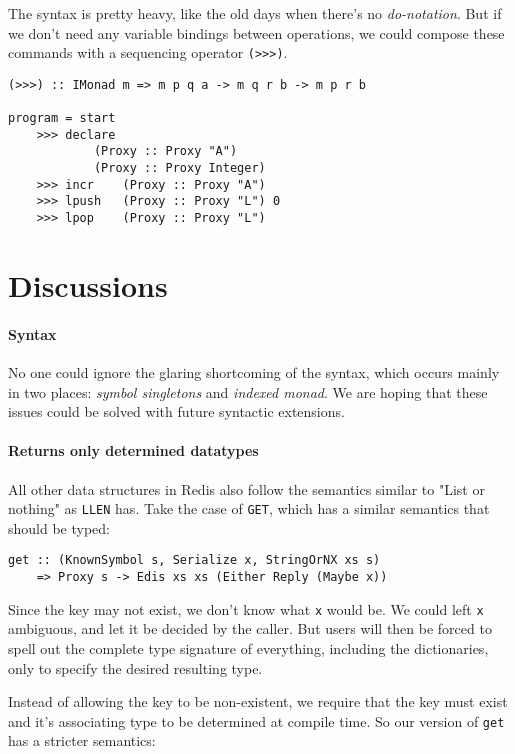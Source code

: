 \documentclass[pldi]{sigplanconf-pldi16}
\begin{document}
The syntax is pretty heavy, like the old days when there's no
 \emph{do-notation}\cite{history}. But if we don't need any variable bindings
 between operations, we could compose these commands with a sequencing operator
 \texttt{(>>>)}.

\begin{verbatim}
(>>>) :: IMonad m => m p q a -> m q r b -> m p r b

program = start
    >>> declare
            (Proxy :: Proxy "A")
            (Proxy :: Proxy Integer)
    >>> incr    (Proxy :: Proxy "A")
    >>> lpush   (Proxy :: Proxy "L") 0
    >>> lpop    (Proxy :: Proxy "L")
\end{verbatim}

\section{Discussions}
\paragraph{Syntax}
No one could ignore the glaring shortcoming of the syntax, which occurs mainly
 in two places: \emph{symbol singletons} and \emph{indexed monad}. We are hoping
 that these issues could be solved with future syntactic extensions.

\paragraph{Returns only determined datatypes}

All other data structures in Redis also follow the semantics similar to
 "List or nothing" as \texttt{LLEN} has. Take the case of
 \texttt{GET}, which has a similar semantics that should be typed:

\begin{verbatim}
get :: (KnownSymbol s, Serialize x, StringOrNX xs s)
    => Proxy s -> Edis xs xs (Either Reply (Maybe x))
\end{verbatim}

Since the key may not exist, we don't know what \texttt{x} would
be. We could left \texttt{x} ambiguous, and let it be decided by
 the caller. But users will then be forced to spell out the complete
type signature of everything, including the dictionaries, only to specify
the desired resulting type.

Instead of allowing the key to be non-existent, we require that the key must
 exist and it's associating type to be determined at compile time. So our
 version of \texttt{get} has a stricter semantics:
\end{document}
